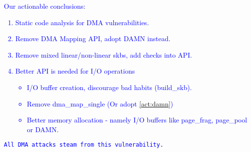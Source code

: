 \textcolor{blue}{
Our actionable conclusions:
\begin{enumerate}
    \item Static code analysis for DMA vulnerabilities.
    \item Remove DMA Mapping API, adopt DAMN instead. \label{act:damn}
    \item Remove mixed linear/non-linear skbs, add checks into \shinfo API.
    \item Better API is needed for I/O operations
    \begin{itemize}
        \item I/O buffer creation, discourage bad habits (build\_skb).
        \item Remove dma\_map\_single (Or adopt \ref{act:damn})
        \item Better memory allocation - namely I/O buffers like page\_frag, page\_pool or DAMN.
    \end{itemize}
\end{enumerate}
\texttt{All DMA attacks steam from this vulnerability.}
}